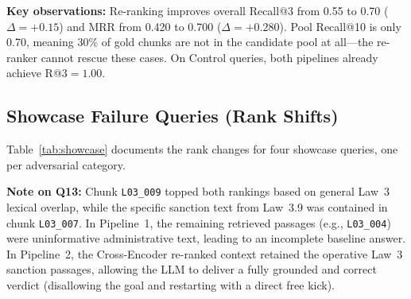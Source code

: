 \documentclass[11pt,a4paper]{article}
\begin{document}
\noindent
\textbf{Key observations:} Re-ranking improves overall Recall@3 from 0.55 to
0.70 ($\Delta{=}+0.15$) and MRR from 0.420 to 0.700 ($\Delta{=}+0.280$).
Pool Recall@10 is only 0.70, meaning 30\% of gold chunks are not in the
candidate pool at all---the re-ranker cannot rescue these cases.  On Control
queries, both pipelines already achieve R@3${}=1.00$.

\subsection{Showcase Failure Queries (Rank Shifts)}

Table~\ref{tab:showcase} documents the rank changes for four showcase queries,
one per adversarial category.

\begin{table}[H]
\centering
\small
\caption{Rank shifts for showcase failure queries (from Cell~10 output).}
\label{tab:showcase}
\end{table}

\noindent
\textbf{Note on Q13:} Chunk \texttt{L03\_009} topped both rankings based on general Law~3 lexical overlap, while the specific sanction text from Law~3.9 was contained in chunk \texttt{L03\_007}. In Pipeline~1, the remaining retrieved passages (e.g., \texttt{L03\_004}) were uninformative administrative text, leading to an incomplete baseline answer. In Pipeline~2, the Cross-Encoder re-ranked context retained the operative Law~3 sanction passages, allowing the LLM to deliver a fully grounded and correct verdict (disallowing the goal and restarting with a direct free kick).
\end{document}
